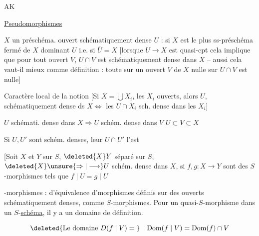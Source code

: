 
AK

\uline{Pseudomorphismes}

$X$ un préschéma. ouvert schématiquement dense $U$ : si $X$ est le plus  ss-préschéma fermé de $X$ dominant $U$ i.e. si $\overline U=X$ [lorsque $U\longrightarrow X$ est quasi-cpt cela implique que pour tout ouvert $V$, $U\cap V$ est schématiquement dense dans $X$ -- aussi cela vaut-il mieux comme définition : toute  sur un ouvert $V$ de $X$ nulle sur $U\cap V$ est nulle]


 Caractère local de la notion [Si $X=\bigcup X_i$, les $X_i$ ouverts, alors $U$, schématiquement dense ds $X\Longleftrightarrow$ les $U\cap X_i$ sch. dense dans les $X_i$]

$U$ schémati. dense dans $X\Rightarrow U$ schém. dense dans  $V$  $U\subset V\subset X$

Si $U,U'$ sont schém. denses, leur $U\cap U'$ l'est

[Soit $X$ et $Y$ sur $S$, $\deleted{X}Y$ séparé sur $S$, $\deleted{X}\unsure{\Rightarrow|\longrightarrow}U$ schém. dense dans $X$, si $f,g:X\longrightarrow Y$ sont des $S$-morphismes tels que $f\mid U=g\mid U$

-morphismes :  d'équivalence d'morphismes définis sur des ouverts schématiquement denses, comme $S$-morphismes. Pour un quasi-$S$-morphisme dans un $S$-\uline{schéma}, il y a un  domaine de définition.

\[
\deleted{\text{Le domaine }D(f\mid V)={}}\quad
\mathrm{Dom}(f\mid V)=\mathrm{Dom}(f)\cap V
\]

